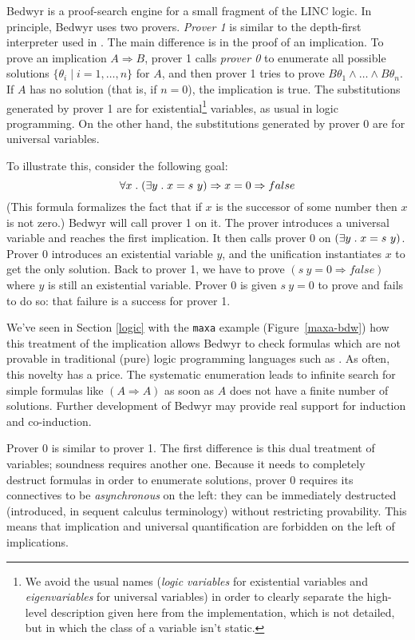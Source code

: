 Bedwyr is a proof-search engine for a small fragment of the LINC
logic.  In principle, Bedwyr uses two provers.  {\em Prover 1} is similar to
the depth-first interpreter used in \lp{}.  The main
difference is in the proof of an implication.
To prove an implication $A\Rightarrow B$, prover 1  calls {\em prover 0}
to enumerate all possible solutions
$\{\theta_i\;|\;i=1,\ldots,n\}$ for $A$,
and then prover 1 tries to prove $B\theta_1\wedge\dots\wedge B\theta_n$.
If $A$ has no solution (that is, if $n=0$), the implication is true.
The substitutions generated by prover 1 are for existential\footnote{
We avoid the usual names (\emph{logic variables} for existential variables and
\emph{eigenvariables} for universal variables) in order to clearly separate the
high-level description given here from the implementation, which is not
detailed, but in which the class of a variable isn't static.}
variables, as usual in logic programming.
On the other hand, the substitutions generated by prover 0 are for
universal variables.

To illustrate this,
consider the following goal:
\[ \forall x \; . \; (\exists y \; . \; x=s~y) \Rightarrow x=0 \Rightarrow false \]
(This formula formalizes the fact that if $x$ is the successor of some
number then $x$ is not zero.)
Bedwyr will call prover 1 on it. The prover introduces a universal variable
and reaches the first implication.
It then calls prover 0 on $(\exists y \; . \; x = s~y)$.
Prover 0 introduces an existential variable $y$,
and the unification instantiates $x$ to get the only solution.
Back to prover 1, we have to prove $(s~y = 0 \Rightarrow false)$
where $y$ is still an existential variable. Prover 0 is given $s~y=0$
to prove and fails to do so: that failure is a success for prover 1.

We've seen in Section \ref{logic} with the \verb.maxa. example
(Figure~\ref{maxa-bdw}) how this treatment of the implication allows
Bedwyr to check formulas which are not provable in traditional (pure) logic
programming languages such as \lp{}.
As often, this novelty has a price. The systematic enumeration leads to
infinite search for simple formulas like $(A \Rightarrow A)$ as soon as
$A$ does not have a finite number of solutions.
Further development of Bedwyr may provide
real support for induction and co-induction.

Prover 0 is similar to prover 1.
The first difference is this dual treatment of variables;
soundness requires another one.
Because it needs to completely destruct formulas in order to enumerate
solutions, prover 0 requires its connectives to be \emph{asynchronous} on the
left: they can be immediately destructed (introduced, in sequent
calculus terminology) without restricting provability.
This means that implication and universal quantification are forbidden on the
left of implications.

